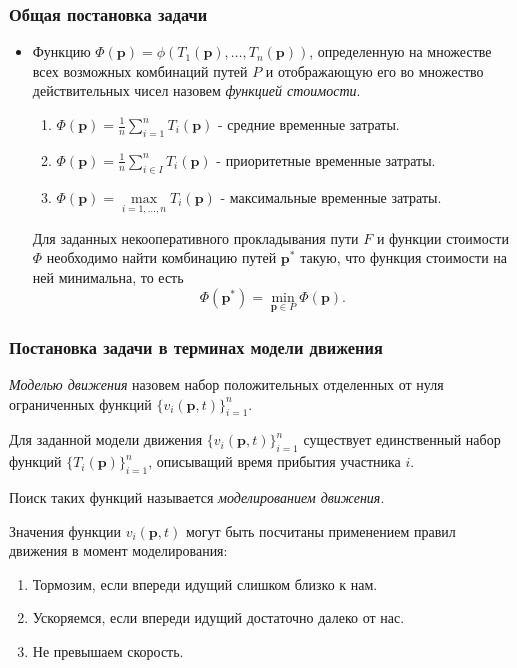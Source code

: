 \documentclass{beamer}
\DeclareMathOperator*{\minn}{min}
\begin{document}
\begin{frame}\frametitle{Общая постановка задачи}
 
    \begin{itemize}
  	
  	\item  Функцию $\Phi (\textbf{p}) = \phi (T_1 (\textbf{p}), \ldots, T_n(\textbf{p}))$, определенную на множестве всех возможных комбинаций путей $P$ и отображающую его во множество действительных чисел назовем \textit{функцией стоимости}.
  	\begin{enumerate}
  		\item  $\Phi (\textbf{p}) = \frac{1}{n}\sum\limits_{i = 1}^n T_i (\textbf{p})$ - средние временные затраты. 
  		\item  $\Phi (\textbf{p}) = \frac{1}{n}\sum\limits_{i \in I}^n T_i (\textbf{p})$ - приоритетные временные затраты.
  		\item  $\Phi (\textbf{p}) = \max\limits_{i = 1, \ldots, n} T_i (\textbf{p})$ - максимальные временные затраты.
  	\end{enumerate}
  
  	\bigskip
	Для заданных некооперативного прокладывания пути $F$ и функции стоимости $\Phi$ необходимо найти комбинацию путей $\textbf{p}^*$ такую, что функция стоимости на ней минимальна, то есть
	\begin{equation}
		\Phi (\textbf{p}^*) = \minn\limits_{ \textbf{p} \in P} \Phi (\textbf{p}).
	\end{equation}
  	
  \end{itemize}
\end{frame}

\begin{frame}\frametitle{Постановка задачи в терминах модели движения}
\textit{Моделью движения} назовем набор положительных отделенных от нуля ограниченных функций $\{v_i(\textbf{p}, t)\}_{i = 1}^n$.

\begin{theorem}
	Для заданной модели движения $\{v_i(\textbf{p}, t)\}_{i = 1}^n$ существует единственный набор функций $\{T_i(\textbf{p})\}_{i = 1}^n$, описыващий время прибытия участника $i$.
\end{theorem}

Поиск таких функций называется \textit{моделированием движения}.

Значения функции $v_i(\textbf{p}, t)$ могут быть посчитаны применением правил движения в момент моделирования:
\begin{enumerate}
	\item Тормозим, если впереди идущий слишком близко к нам.
	\item Ускоряемся, если впереди идущий достаточно далеко от нас.
	\item Не превышаем скорость.
\end{enumerate}
\end{frame}
\end{document}
